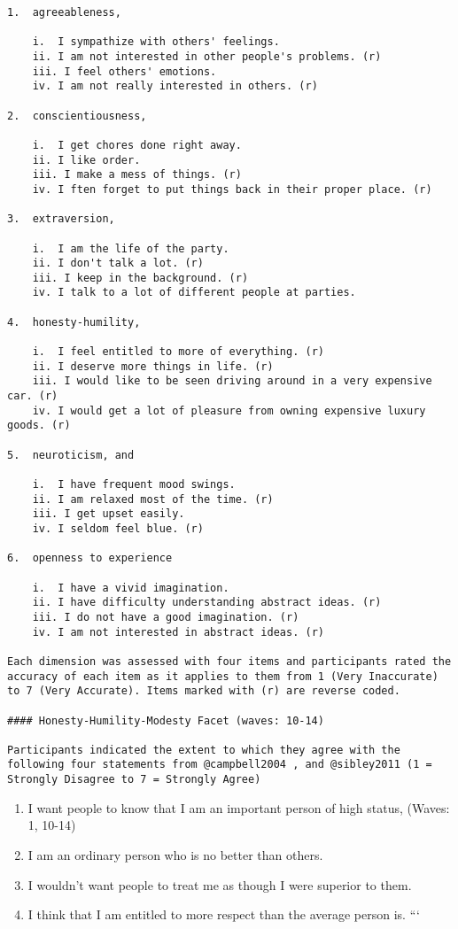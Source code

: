 \documentclass[
  singlecolumn]{article}
\providecommand{\tightlist}{%
  \setlength{\itemsep}{0pt}\setlength{\parskip}{0pt}}\usepackage{longtable,booktabs,array}
\begin{document}
\begin{verbatim}
1.  agreeableness,

    i.  I sympathize with others' feelings.
    ii. I am not interested in other people's problems. (r)
    iii. I feel others' emotions.
    iv. I am not really interested in others. (r)

2.  conscientiousness,

    i.  I get chores done right away.
    ii. I like order.
    iii. I make a mess of things. (r)
    iv. I ften forget to put things back in their proper place. (r)

3.  extraversion,

    i.  I am the life of the party.
    ii. I don't talk a lot. (r)
    iii. I keep in the background. (r)
    iv. I talk to a lot of different people at parties.

4.  honesty-humility,

    i.  I feel entitled to more of everything. (r)
    ii. I deserve more things in life. (r)
    iii. I would like to be seen driving around in a very expensive car. (r)
    iv. I would get a lot of pleasure from owning expensive luxury goods. (r)

5.  neuroticism, and

    i.  I have frequent mood swings.
    ii. I am relaxed most of the time. (r)
    iii. I get upset easily.
    iv. I seldom feel blue. (r)

6.  openness to experience

    i.  I have a vivid imagination.
    ii. I have difficulty understanding abstract ideas. (r)
    iii. I do not have a good imagination. (r)
    iv. I am not interested in abstract ideas. (r)

Each dimension was assessed with four items and participants rated the accuracy of each item as it applies to them from 1 (Very Inaccurate) to 7 (Very Accurate). Items marked with (r) are reverse coded.

#### Honesty-Humility-Modesty Facet (waves: 10-14)

Participants indicated the extent to which they agree with the following four statements from @campbell2004 , and @sibley2011 (1 = Strongly Disagree to 7 = Strongly Agree)
\end{verbatim}

\begin{enumerate}
\def\labelenumi{\roman{enumi}.}
\tightlist
\item
  I want people to know that I am an important person of high status,
  (Waves: 1, 10-14)
\item
  I am an ordinary person who is no better than others.
\item
  I wouldn't want people to treat me as though I were superior to them.
\item
  I think that I am entitled to more respect than the average person is.
  ```
\end{enumerate}
\end{document}
